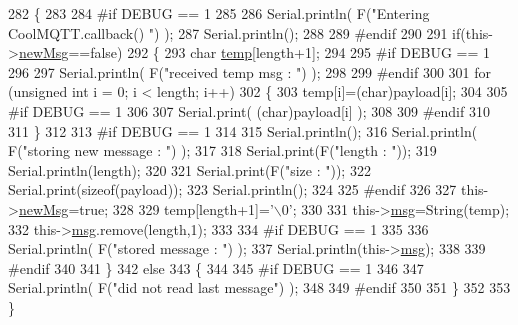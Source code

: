 \begin{DoxyCode}
282 \{
283 
284 \textcolor{preprocessor}{#if DEBUG == 1}
285 
286     Serial.println( F(\textcolor{stringliteral}{"Entering CoolMQTT.callback() "}) );
287     Serial.println();
288 
289 \textcolor{preprocessor}{#endif }
290 
291     \textcolor{keywordflow}{if}(this->\hyperlink{classCoolMQTT_a3240388137b885775aadf38e96b24c6b}{newMsg}==\textcolor{keyword}{false})
292     \{
293         \textcolor{keywordtype}{char} \hyperlink{Irene3000_8h_a5905d48604152cf57aa6bfa087b49173}{temp}[length+1];
294 
295 \textcolor{preprocessor}{    #if DEBUG == 1}
296 
297         Serial.println( F(\textcolor{stringliteral}{"received temp msg : "}) );
298         
299 \textcolor{preprocessor}{    #endif}
300         
301         \textcolor{keywordflow}{for} (\textcolor{keywordtype}{unsigned} \textcolor{keywordtype}{int} i = 0; i < length; i++) 
302         \{
303             temp[i]=(char)payload[i];
304         
305 \textcolor{preprocessor}{        #if DEBUG == 1 }
306 
307             Serial.print( (\textcolor{keywordtype}{char})payload[i] );
308         
309 \textcolor{preprocessor}{        #endif}
310 
311         \}
312     
313 \textcolor{preprocessor}{    #if DEBUG == 1 }
314 
315         Serial.println();
316         Serial.println( F(\textcolor{stringliteral}{"storing new message : "}) );
317 
318         Serial.print(F(\textcolor{stringliteral}{"length : "}));
319         Serial.println(length);
320         
321         Serial.print(F(\textcolor{stringliteral}{"size : "}));
322         Serial.print(\textcolor{keyword}{sizeof}(payload));
323         Serial.println();
324     
325 \textcolor{preprocessor}{    #endif}
326 
327         this->\hyperlink{classCoolMQTT_a3240388137b885775aadf38e96b24c6b}{newMsg}=\textcolor{keyword}{true};
328 
329         temp[length+1]=\textcolor{charliteral}{'\(\backslash\)0'};
330 
331         this->\hyperlink{classCoolMQTT_af6b19e7074dbbb4ae493c44dcb53f7ff}{msg}=String(temp);
332         this->\hyperlink{classCoolMQTT_af6b19e7074dbbb4ae493c44dcb53f7ff}{msg}.remove(length,1);
333     
334 \textcolor{preprocessor}{    #if DEBUG == 1 }
335 
336         Serial.println( F(\textcolor{stringliteral}{"stored message : "}) );
337         Serial.println(this->\hyperlink{classCoolMQTT_af6b19e7074dbbb4ae493c44dcb53f7ff}{msg});
338     
339 \textcolor{preprocessor}{    #endif}
340 
341     \}
342     \textcolor{keywordflow}{else}
343     \{
344     
345 \textcolor{preprocessor}{    #if DEBUG == 1}
346 
347         Serial.println( F(\textcolor{stringliteral}{"did not read last message"}) );
348     
349 \textcolor{preprocessor}{    #endif }
350         
351     \}
352 
353 \}
\end{DoxyCode}
